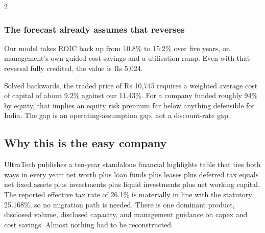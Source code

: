 \begin{paracol}{2}
\subsubsection{The forecast already assumes that reverses} Our model takes ROIC back
up from 10.8\% to 15.2\% over five years, on management's own guided cost savings and
a utilisation ramp. Even with that reversal fully credited, the value is Rs 5,024.

\begin{keybox}
Solved backwards, the traded price of Rs 10,745 requires a weighted average cost of
capital of about 9.2\% against our 11.43\%. For a company funded roughly 94\% by
equity, that implies an equity risk premium far below anything defensible for India.
The gap is an operating-assumption gap, not a discount-rate gap.
\end{keybox}

\subsection{Why this is the easy company}

UltraTech publishes a ten-year standalone financial highlights table that ties both
ways in every year: net worth plus loan funds plus leases plus deferred tax equals
net fixed assets plus investments plus liquid investments plus net working capital.
The reported effective tax rate of 26.1\% is materially in line with the statutory
25.168\%, so no migration path is needed. There is one dominant product, disclosed
volume, disclosed capacity, and management guidance on capex and cost savings. Almost
nothing had to be reconstructed.

\switchcolumn
{}




\end{paracol}
